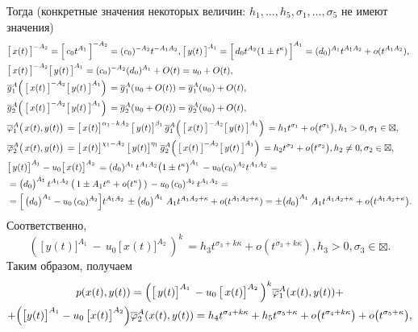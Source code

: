 \documentclass[11pt,reqno]{amsart}
\theoremstyle{plain}
\theoremstyle{definition}
\begin{document}
Тогда (конкретные значения некоторых величин: $h_1,\dots,h_5,\sigma_1,\dots,\sigma_5$ не имеют значения)
\begin{align*}
    &\bigl[\,x(t)\,\bigr]^{-A_2} = \Bigl[\,c_0t^{A_1}\,\Bigr]^{-A_2} = (c_0)^{-A_2}t^{-A_1A_2}, \bigl[\,y(t)\,\bigr]^{A_1} = \Bigl[\,d_0t^{A_2}(1 \pm t^\kappa)\,\Bigr]^{A_1} = (d_0)^{A_1}t^{A_1A_2} + o(t^{A_1A_2}),\\
    &\bigl[\,x(t)\,\bigr]^{-A_2}\bigl[\,y(t)\,\bigr]^{A_1} = (c_0)^{-A_2}(d_0)^{A_1} + O(t) = u_0 + O(t),\\
    &\overline{g}_1^A\Bigl(\,\bigl[\,x(t)\,\bigr]^{-A_2}\bigl[\,y(t)\,\bigr]^{A_1}\Bigr)\, = \overline{g}_1^A(u_0 + O(t)) = \overline{g}_1^A(u_0) + O(t),\\
    &\overline{g}_2^A\Bigl(\,\bigl[\,x(t)\,\bigr]^{-A_2}\bigl[\,y(t)\,\bigr]^{A_1}\Bigr)\, = \overline{g}_2^A(u_0 + O(t)) = \overline{g}_2^A(u_0) + O(t),\\
    &\overline{\varphi}_1^A\bigl(\,x(t), y(t)\bigr)\, = \bigl[\,x(t)\bigr]^{\alpha_1-kA_2}\,\bigl[\,y(t)\bigr]^{\beta_1}\,\overline{g}_1^A\Bigl(\,\bigl[\,x(t)\,\bigr]^{-A_2}\bigl[\,y(t)\,\bigr]^{A_1}\Bigr)\, = h_1t^{\sigma_1} + o\bigl(t^{\sigma_1}\bigr), h_1 > 0, \sigma_1 \in \boxtimes,\\
    &\overline{\varphi}_2^A\bigl(\,x(t), y(t)\bigr)\, = \bigl[\,x(t)\bigr]^{\chi_1-A_2}\,\bigl[\,y(t)\bigr]^{\eta_1}\,\overline{g}_2^A\Bigl(\,\bigl[\,x(t)\,\bigr]^{-A_2}\bigl[\,y(t)\,\bigr]^{A_1}\Bigr)\, = h_2t^{\sigma_2} + o\bigl(t^{\sigma_2}\bigr), h_2 \neq 0, \sigma_2 \in \boxtimes,\\
    &\bigl[\,y(t)\bigr]^{A_1} - u_0\bigl[\,x(t)\bigr]^{A_2}\, = (d_0)^{A_1}\,t^{A_1A_2}\bigl(1 \pm t^\kappa\bigr)^{A_1}\, - u_0(c_0)^{A_2}t^{A_1A_2} =\\
    &= \bigl(d_0\bigr)^{A_1}\,t^{A_1A_2}\, \bigl(\, 1 \pm A_1t^\kappa + o(t^\kappa\bigr)\,)\,-u_0\,(c_0)^{A_2}\,t^{A_1A_2} =\\
    &=\Bigl[\,\bigl(d_0\bigr)^{A_1} - u_0\,(c_0)^{A_2}\Bigr]t^{A_1A_2}\, \pm \bigl(d_0\bigr)^{A_1}\; A_1t^{A_1A_2+\kappa} + o(t^{A_1A_2 + \kappa}) = \pm \bigl(d_0\bigr)^{A_1}\; A_1t^{A_1A_2+\kappa} + o\bigl(t^{A_1A_2+\kappa}\bigr).
\end{align*}
Соответственно,
\[(\,\bigl[\,y(t)\bigr]^{A_1}\, -\,u_0\,\bigl[\,x(t)\bigr]^{A_2}\,)^k\, = h_3t^{\sigma_3+k\kappa} + o(t^{\sigma_3+k\kappa}), h_3 > 0, \sigma_3 \in \boxtimes.\]
Таким образом, получаем
\begin{equation}
\label{nef:eq:1}
\begin{gathered}
    p(x(t),y(t)) = \Bigl(\bigl[\,y(t)\bigr]^{A_1}\, - u_0\,\bigl[\,x(t)\bigr]^{A_2}\,\Bigr)^k \overline{\varphi}_1^A(x(t), y(t)) + \\
    + \Bigl(\bigl[y(t)\bigr]^{A_1} - u_0\,\bigl[x(t)\bigr]^{A_2}\Bigr)\overline{\varphi}_2^A(x(t),y(t)) = h_4t^{\sigma_4+k\kappa} + h_5t^{\sigma_5+\kappa} + o\bigl(t^{\sigma_4+k\kappa}\bigr) + o\bigl(t^{\sigma_5+\kappa}\bigr),
\end{gathered}
\end{equation}
\end{document}
